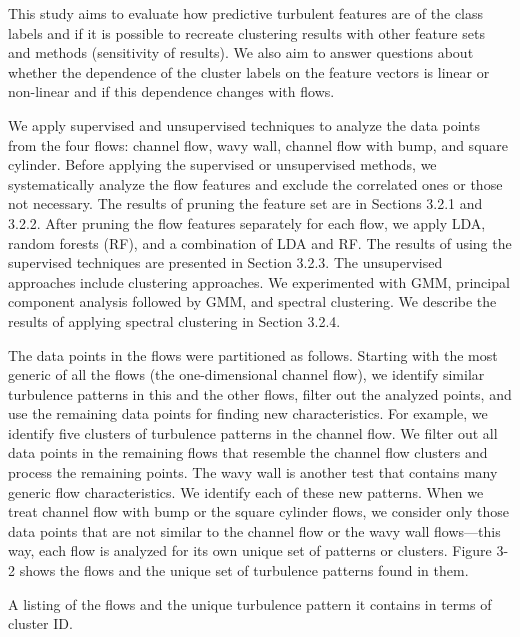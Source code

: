 This study aims to evaluate how predictive turbulent features are of the class labels and if it is possible to recreate clustering results with other feature sets and methods (sensitivity of results).
We also aim to answer questions about whether the dependence of the cluster labels on the feature vectors
is linear or non-linear and if this dependence changes with ﬂows.

We apply supervised and unsupervised techniques to analyze the data points from the four ﬂows: channel
ﬂow, wavy wall, channel ﬂow with bump, and square cylinder. Before applying the supervised or
unsupervised methods, we systematically analyze the ﬂow features and exclude the correlated ones or those
not necessary. The results of pruning the feature set are in Sections 3.2.1 and 3.2.2. After pruning the ﬂow
features separately for each ﬂow, we apply LDA, random forests (RF), and a combination of LDA and RF.
The results of using the supervised techniques are presented in Section 3.2.3. The unsupervised approaches
include clustering approaches. We experimented with GMM, principal component analysis followed by
GMM, and spectral clustering. We describe the results of applying spectral clustering in Section 3.2.4.

The data points in the ﬂows were partitioned as follows. Starting with the most generic of all the ﬂows (the
one-dimensional channel ﬂow), we identify similar turbulence patterns in this and the other ﬂows, ﬁlter out
the analyzed points, and use the remaining data points for ﬁnding new characteristics. For example, we
identify ﬁve clusters of turbulence patterns in the channel ﬂow. We ﬁlter out all data points in the remaining
ﬂows that resemble the channel ﬂow clusters and process the remaining points. The wavy wall is another
test that contains many generic ﬂow characteristics. We identify each of these new patterns. When we treat
channel ﬂow with bump or the square cylinder ﬂows, we consider only those data points that are not similar
to the channel ﬂow or the wavy wall ﬂows—this way, each ﬂow is analyzed for its own unique set of
patterns or clusters. Figure 3-2 shows the ﬂows and the unique set of turbulence patterns found in them.

A listing of the ﬂows and the unique turbulence pattern it contains in terms of cluster ID.


